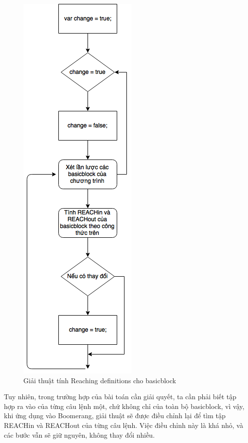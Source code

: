 \begin{figure}
	\centering
	\includegraphics[scale=0.75]{image/reachingDefAlgo}
	\caption{Giải thuật tính Reaching definitions cho basicblock}
	\label{fig:reachingdefalgo}
\end{figure}

Tuy nhiên, trong trường hợp của bài toán cần giải quyết, ta cần phải biết tập hợp ra vào của từng câu lệnh một, chứ không chỉ của toàn bộ basicblock, vì vậy, khi ứng dụng vào Boomerang, giải thuật sẽ được điều chỉnh lại để tìm tập REACHin và REACHout của từng câu lệnh. Việc điều chỉnh này là khá nhỏ, và các bước vẫn sẽ giữ nguyên, không thay đổi nhiều.\\

